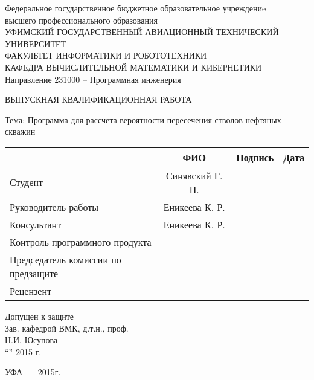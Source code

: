 \begin{titlepage}
\newpage

\begin{center}
Федеральное государственное бюджетное образовательное учреждениe\\
высшего профессионального образования \\
\vspace{0.5cm}
УФИМСКИЙ ГОСУДАРСТВЕННЫЙ АВИАЦИОННЫЙ ТЕХНИЧЕСКИЙ УНИВЕРСИТЕТ\\
\vspace{0.5cm}
ФАКУЛЬТЕТ  ИНФОРМАТИКИ  И  РОБОТОТЕХНИКИ \\
\vspace{0.5cm}
КАФЕДРА  ВЫЧИСЛИТЕЛЬНОЙ  МАТЕМАТИКИ  И  КИБЕРНЕТИКИ\\
\vspace{0.5cm}
Направление 231000 – Программная инженерия
\end{center}
 
\vspace{2em}

\begin{center}
\Large {ВЫПУСКНАЯ КВАЛИФИКАЦИОННАЯ РАБОТА}

\vspace{2.5em}
 
Тема: Программа для рассчета вероятности пересечения стволов нефтяных скважин
\end{center}

\vspace{3em}
\noindent
\begin{tabularx}{\textwidth}{|l|c|X|X|}
\hline
& ФИО & Подпись & Дата\\
\hline
Студент & Синявский Г. Н. &&\\
\hline
Руководитель работы & Еникеева К. Р. &&\\
\hline
Консультант & Еникеева К. Р. &&\\
\hline
Контроль программного продукта &&&\\
\hline
Председатель комиссии по предзащите &&&\\
\hline
Рецензент &&& \\
\hline
\end{tabularx} 

\vspace{2em}
\center Допущен к защите\\
Зав. кафедрой  ВМК, д.т.н., проф.\\
\underline{\hspace{5cm}} Н.И. Юсупова\\
“\underline{\hspace{1cm}}”\underline{\hspace{5cm}} 2015 г.

\vspace{\fill}

\begin{center}
УФА~--- 2015г.
\end{center}

\end{titlepage}